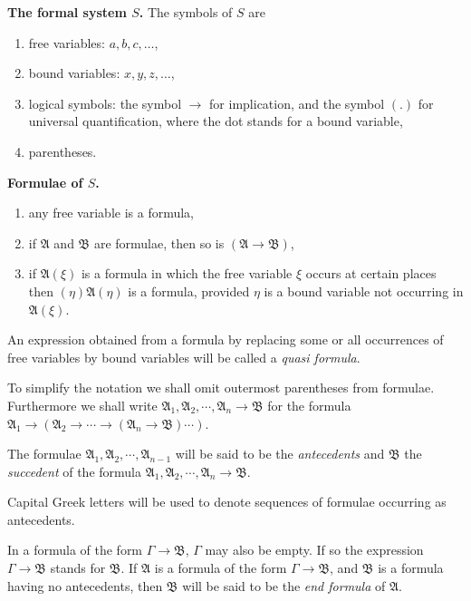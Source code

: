 \documentclass[12pt,a4paper]{article}
\begin{document}
\bigskip
\noindent\textbf{The formal system $S$.}\quad
The symbols of $S$ are
\begin{enumerate}
\item free variables: $a, b, c, \ldots$,
\item bound variables: $x, y, z, \ldots$,
\item logical symbols: the symbol $\to$ for implication, and the symbol $(.)$
  for universal quantification, where the dot stands for a bound variable,
\item parentheses.
\end{enumerate}

\noindent\textbf{Formulae of $S$.}
\begin{enumerate}
\item any free variable is a formula,
\item if $\mathfrak{A}$ and $\mathfrak{B}$ are formulae, then so is
  $(\mathfrak{A} \to \mathfrak{B})$,
\item if $\mathfrak{A}(\xi)$ is a formula in which the free variable $\xi$
  occurs at certain places then $(\eta)\mathfrak{A}(\eta)$ is a formula,
  provided $\eta$ is a bound variable not occurring in $\mathfrak{A}(\xi)$.
\end{enumerate}

An expression obtained from a formula by replacing some or all occurrences of
free variables by bound variables will be called a \emph{quasi formula}.

To simplify the notation we shall omit outermost parentheses from formulae.
Furthermore we shall write
$\mathfrak{A}_1, \mathfrak{A}_2, \cdots, \mathfrak{A}_n \to \mathfrak{B}$
for the formula
$\mathfrak{A}_1 \to (\mathfrak{A}_2 \to \cdots \to (\mathfrak{A}_n \to
\mathfrak{B})\cdots)$.

The formulae $\mathfrak{A}_1, \mathfrak{A}_2, \cdots, \mathfrak{A}_{n-1}$
will be said to be the \emph{antecedents} and $\mathfrak{B}$ the
\emph{succedent} of the formula
$\mathfrak{A}_1, \mathfrak{A}_2, \cdots, \mathfrak{A}_n \to \mathfrak{B}$.

Capital Greek letters will be used to denote sequences of formulae occurring
as antecedents.

In a formula of the form $\Gamma \to \mathfrak{B}$, $\Gamma$ may also be
empty. If so the expression $\Gamma \to \mathfrak{B}$ stands for
$\mathfrak{B}$. If $\mathfrak{A}$ is a formula of the form
$\Gamma \to \mathfrak{B}$, and $\mathfrak{B}$ is a formula having no
antecedents, then $\mathfrak{B}$ will be said to be the \emph{end formula}
of $\mathfrak{A}$.
\end{document}
